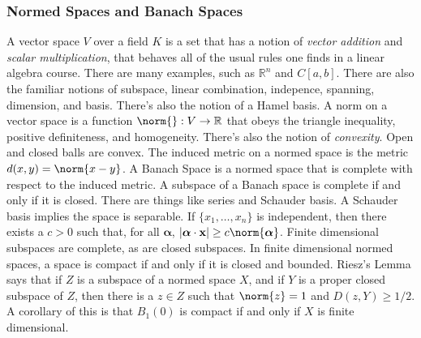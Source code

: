 \documentclass[crop=false,class=book,oneside]{standalone}
\begin{document}
            \subsubsection{Normed Spaces and Banach Spaces}
                A vector space $V$ over a field $K$ is a set that has
                a notion of \textit{vector addition} and
                \textit{scalar multiplication}, that behaves all of the
                usual rules one finds in a linear algebra course. There are
                many examples, such as $\mathbb{R}^{n}$ and $C[a,b]$.
                There are also the familiar notions of subspace,
                linear combination, indepence, spanning, dimension, and
                basis. There's also the notion of a Hamel basis. A norm on
                a vector space is a function $\norm{}:V\rightarrow\mathbb{R}$
                that obeys the triangle inequality, positive definiteness,
                and homogeneity. There's also the notion of
                \textit{convexity}. Open and closed balls are convex.
                The induced metric on a normed space is the metric
                $d(x,y)=\norm{x-y}$. A Banach Space is a normed space
                that is complete with respect to the induced metric.
                A subspace of a Banach space is complete if and only if
                it is closed. There are things like series and Schauder basis.
                A Schauder basis implies the space is separable. If
                $\{x_{1},\hdots,x_{n}\}$ is independent, then there exists
                a $c>0$ such that, for all $\boldsymbol{\alpha}$,
                $|\boldsymbol{\alpha}\cdot\mathbf{x}|%
                 \geq{c}\norm{\boldsymbol{\alpha}}$.
                Finite dimensional subspaces are complete, as are closed
                subspaces. In finite dimensional normed spaces,
                a space is compact if and only if it is closed and bounded.
                Riesz's Lemma says that if $Z$ is a subspace of a normed
                space $X$, and if $Y$ is a proper closed subspace of
                $Z$, then there is a $z\in{Z}$ such that
                $\norm{z}=1$ and $D(z,Y)\geq{1/2}$. A corollary of this is
                that $B_{1}(0)$ is compact if and only if
                $X$ is finite dimensional.
\end{document}
